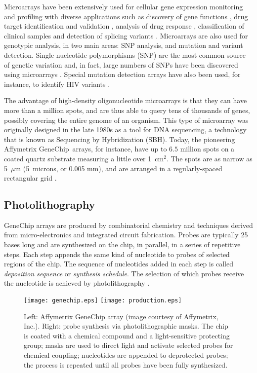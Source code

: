Microarrays have been extensively used for cellular gene expression monitoring
and profiling \citep{Schena1995,Lockhart1996} with diverse applications such as
discovery of gene functions \citep{Cho1998,Hughes2000}, drug target
identification and validation \citep{Marton1998,Liotta2000}, analysis of drug
response \citep{Debouck1999}, classification of clinical samples
\citep{Perou1999} and detection of splicing variants \citep{Hu2001}. Microarrays
are also used for genotypic analysis, in two main areas: SNP analysis, and
mutation and variant detection. Single nucleotide polymorphisms (SNP) are the
most common source of genetic variation and, in fact, large numbers of SNPs have
been discovered using microarrays \citep{Lindblad-Toh2000}. Special mutation
detection arrays have also been used, for instance, to identify HIV variants
\citep{Kozal1996}.

The advantage of high-density oligonucleotide microarrays is that they can have
more than a million spots, and are thus able to query tens of thousands of
genes, possibly covering the entire genome of an organism. This type of
microarray was originally designed in the late 1980s as a tool for DNA
sequencing, a technology that is known as Sequencing by Hybridization (SBH).
Today, the pioneering Affymetrix GeneChip\textR\ arrays, for instance, have up
to $6.5$ million spots on a coated quartz substrate measuring a little over
1~cm$^2$. The spots are as narrow as 5~$\mu$m (5~microns, or 0.005 mm), and are
arranged in a regularly-spaced rectangular grid \citep{McGall2002}.

\subsection{Photolithography}

GeneChip arrays are produced by combinatorial chemistry and techniques derived
from micro-electronics and integrated circuit fabrication. Probes are typically
25 bases long and are synthesized on the chip, in parallel, in a series of
repetitive steps. Each step appends the same kind of nucleotide to probes of
selected regions of the chip. The sequence of nucleotides added in each step is
called \emph{deposition sequence} or \emph{synthesis schedule}. The selection of
which probes receive the nucleotide is achieved by photolithography
\citep{Fodor1991,Fodor1993,Lipshutz1999}.

\begin{figure}[t]\centering
\texttt{[image: genechip.eps]}
\hfill
\texttt{[image: production.eps]}
\caption{Left: Affymetrix GeneChip array (image courtesy of Affymetrix, Inc.).
  Right: probe synthesis via photolithographic masks. The chip is coated with a
  chemical compound and a light-sensitive protecting group; masks are used to
  direct light and activate selected probes for chemical coupling; nucleotides
  are appended to deprotected probes; the process is repeated until all probes
  have been fully synthesized.}
\label{fig:photolithography}
\end{figure}

